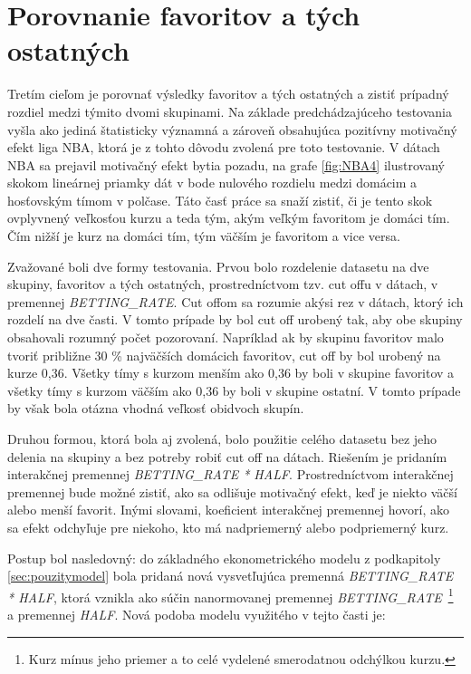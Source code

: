 \documentclass[
  digital, %
  twoside, %
  notable,   %
  lof,     %
  lot,     %
]{fithesis3}
\begin{document}
	\section{Porovnanie favoritov a tých ostatných}
	Tretím cieľom je porovnať výsledky favoritov a tých ostatných a zistiť prípadný rozdiel medzi týmito dvomi skupinami. Na základe predchádzajúceho testovania vyšla ako jediná štatisticky významná a zároveň obsahujúca pozitívny motivačný efekt liga NBA, ktorá je z tohto dôvodu zvolená pre toto testovanie. V dátach NBA sa prejavil motivačný efekt bytia pozadu, na grafe \ref{fig:NBA4} ilustrovaný skokom lineárnej priamky dát v bode nulového rozdielu medzi domácim a hosťovským tímom v polčase. Táto časť práce sa snaží zistiť, či je tento skok ovplyvnený veľkosťou kurzu a teda tým, akým veľkým favoritom je domáci tím. Čím nižší je kurz na domáci tím, tým väčším je favoritom a vice versa. 

	Zvažované boli dve formy testovania. Prvou bolo rozdelenie datasetu na dve skupiny, favoritov a tých ostatných, prostredníctvom tzv. cut offu v dátach, v premennej \textit{BETTING\_RATE}. Cut offom sa rozumie akýsi rez v dátach, ktorý ich rozdelí na dve časti. V tomto prípade by bol cut off urobený tak, aby obe skupiny obsahovali rozumný počet pozorovaní. Napríklad ak by skupinu favoritov malo tvoriť približne 30 \% najväčších domácich favoritov, cut off by bol urobený na kurze 0,36. Všetky tímy s kurzom menším ako 0,36 by boli v skupine favoritov a všetky tímy s kurzom väčším ako 0,36 by boli v skupine ostatní. V tomto prípade by však bola otázna vhodná veľkosť obidvoch skupín.

	Druhou formou, ktorá bola aj zvolená, bolo použitie celého datasetu bez jeho delenia na skupiny a bez potreby robiť cut off na dátach. Riešením je pridaním interakčnej premennej \textit{BETTING\_RATE * HALF}.  Prostredníctvom interakčnej premennej bude možné zistiť, ako sa odlišuje motivačný efekt, keď je niekto väčší alebo menší favorit. Inými slovami, koeficient interakčnej premennej hovorí, ako sa efekt odchyľuje pre niekoho, kto má nadpriemerný alebo podpriemerný kurz. 
	
	Postup bol nasledovný: do základného ekonometrického modelu z podkapitoly \ref{sec:pouzitymodel} bola pridaná nová vysvetľujúca premenná \textit{BETTING\_RATE * HALF}, ktorá vznikla ako súčin nanormovanej premennej \textit{BETTING\_RATE}~\footnote{Kurz mínus jeho priemer a to celé vydelené smerodatnou odchýlkou kurzu.} a premennej \textit{HALF}. Nová podoba modelu využitého v tejto časti je:
	
\end{document}
